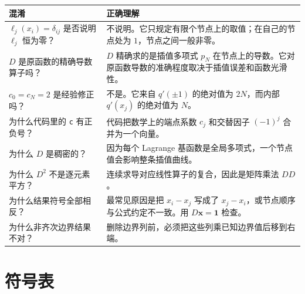 \documentclass[11pt,a4paper]{ctexart}
\numberwithin{equation}{section}
\newcommand{\vect}[1]{\bm{#1}}
\begin{document}
\begin{longtable}{>{\raggedright\arraybackslash}p{}p{}}
\toprule
混淆 & 正确理解\\
\midrule
\endhead
$\ell_j(x_i)=\delta_{ij}$ 是否说明 $\ell_j$ 恒为零？
& 不说明。它只规定有限个节点上的取值；在自己的节点处为 $1$，节点之间一般非零。\\

$D$ 是原函数的精确导数算子吗？
& $D$ 精确求的是插值多项式 $p_N$ 在节点上的导数。它对原函数导数的准确程度取决于插值误差和函数光滑性。\\

$c_0=c_N=2$ 是经验修正吗？
& 不是。它来自 $q'(\pm1)$ 的绝对值为 $2N$，而内部 $q'(x_j)$ 的绝对值为 $N$。\\

为什么代码里的 \texttt{c} 有正负号？
& 代码把数学上的端点系数 $c_j$ 和交替因子 $(-1)^j$ 合并为一个向量。\\

为什么 $D$ 是稠密的？
& 因为每个 Lagrange 基函数是全局多项式，一个节点值会影响整条插值曲线。\\

为什么 $D^2$ 不是逐元素平方？
& 连续求导对应线性算子的复合，因此是矩阵乘法 $D D$。\\

为什么结果符号全部相反？
& 最常见原因是把 $x_i-x_j$ 写成了 $x_j-x_i$，或节点顺序与公式约定不一致。用 $D\vect{x}=\vect{1}$ 检查。\\

为什么非齐次边界结果不对？
& 删除边界列前，必须把这些列乘已知边界值后移到右端。\\
\bottomrule
\end{longtable}

\section{符号表}
\end{document}
